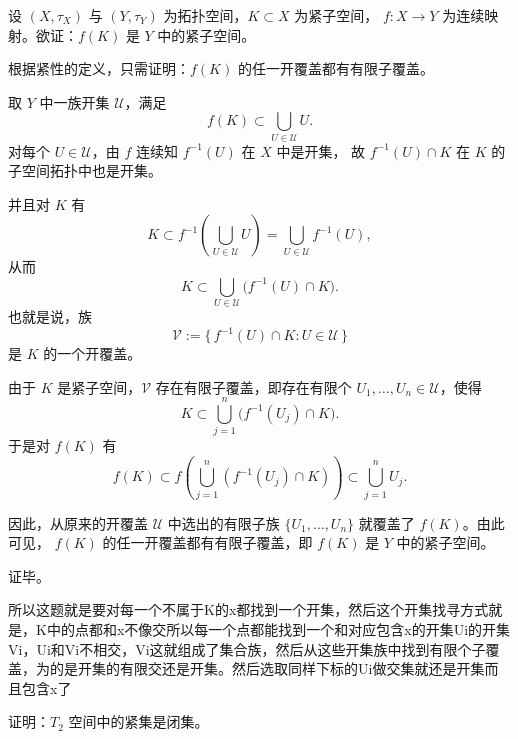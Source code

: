 \begin{solution}
设 $(X,\tau_X)$ 与 $(Y,\tau_Y)$ 为拓扑空间，$K\subset X$ 为紧子空间，
$f:X\to Y$ 为连续映射。欲证：$f(K)$ 是 $Y$ 中的紧子空间。

根据紧性的定义，只需证明：$f(K)$ 的任一开覆盖都有有限子覆盖。

取 $Y$ 中一族开集 $\mathcal{U}$，满足
\[
f(K)\subset \bigcup_{U\in\mathcal{U}} U.
\]
对每个 $U\in\mathcal{U}$，由 $f$ 连续知 $f^{-1}(U)$ 在 $X$ 中是开集，
故 $f^{-1}(U)\cap K$ 在 $K$ 的子空间拓扑中也是开集。

并且对 $K$ 有
\[
K \subset f^{-1}\!\left(\bigcup_{U\in\mathcal{U}} U\right)
= \bigcup_{U\in\mathcal{U}} f^{-1}(U),
\]
从而
\[
K \subset \bigcup_{U\in\mathcal{U}} \bigl(f^{-1}(U)\cap K\bigr).
\]
也就是说，族
\[
\mathcal{V} := \{\,f^{-1}(U)\cap K : U\in\mathcal{U}\,\}
\]
是 $K$ 的一个开覆盖。

由于 $K$ 是紧子空间，$\mathcal{V}$ 存在有限子覆盖，即存在有限个
$U_1,\dots,U_n\in\mathcal{U}$，使得
\[
K \subset \bigcup_{j=1}^{n} \bigl(f^{-1}(U_j)\cap K\bigr).
\]
于是对 $f(K)$ 有
\[
f(K)
\subset f\!\left(\bigcup_{j=1}^{n} (f^{-1}(U_j)\cap K)\right)
\subset \bigcup_{j=1}^{n} U_j.
\]

因此，从原来的开覆盖 $\mathcal{U}$ 中选出的有限子族
$\{U_1,\dots,U_n\}$ 就覆盖了 $f(K)$。由此可见，
$f(K)$ 的任一开覆盖都有有限子覆盖，即 $f(K)$ 是 $Y$ 中的紧子空间。

证毕。
\end{solution}
\begin{dxtips}
    所以这题就是要对每一个不属于K的x都找到一个开集，然后这个开集找寻方式就是，K中的点都和x不像交所以每一个点都能找到一个和对应包含x的开集Ui的开集Vi，Ui和Vi不相交，Vi这就组成了集合族，然后从这些开集族中找到有限个子覆盖，为的是开集的有限交还是开集。然后选取同样下标的Ui做交集就还是开集而且包含x了
\end{dxtips}
\begin{homework}[3]
证明：$T_2$ 空间中的紧集是闭集。
\end{homework}
